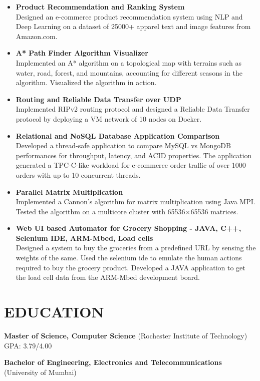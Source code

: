 \documentclass[a4paper,10pt]{article}
\begin{document}
\begin{itemize}[noitemsep, topsep=0pt]
    \item \textbf{Product Recommendation and Ranking System} \\ 
    Designed an e-commerce product recommendation system using NLP and Deep Learning on a dataset of 25000+ apparel text and image features from Amazon.com.

    \item \textbf{A* Path Finder Algorithm Visualizer} \\ 
    Implemented an A* algorithm on a topological map with terrains such as water, road, forest, and mountains, accounting for different seasons in the algorithm. Visualized the algorithm in action.

    \item \textbf{Routing and Reliable Data Transfer over UDP} \\ 
    Implemented RIPv2 routing protocol and designed a Reliable Data Transfer protocol by deploying a VM network of 10 nodes on Docker.

    \item \textbf{Relational and NoSQL Database Application Comparison} \\ 
    Developed a thread-safe application to compare MySQL vs MongoDB performances for throughput, latency, and ACID properties. The application generated a TPC-C-like workload for e-commerce order traffic of over 1000 orders with up to 10 concurrent threads.

    \item \textbf{Parallel Matrix Multiplication} \\ 
    Implemented a Cannon’s algorithm for matrix multiplication using Java MPI. Tested the algorithm on a multicore cluster with 65536×65536 matrices.

    \item \textbf{Web UI based Automator for Grocery Shopping - JAVA, C++, Selenium IDE, ARM-Mbed, Load cells} \\ 
    Designed a system to buy the groceries from a predefined URL by sensing the weights of the same. Used the selenium ide to emulate the human actions required to buy the grocery product. Developed a JAVA application to get the load cell data from the ARM-Mbed development board.
\end{itemize}





\section*{\textbf{EDUCATION}}
\noindent\textbf{Master of Science, Computer Science} (Rochester Institute of Technology) \\
GPA: 3.79/4.00

\noindent\textbf{Bachelor of Engineering, Electronics and Telecommunications} (University of Mumbai)
\end{document}
